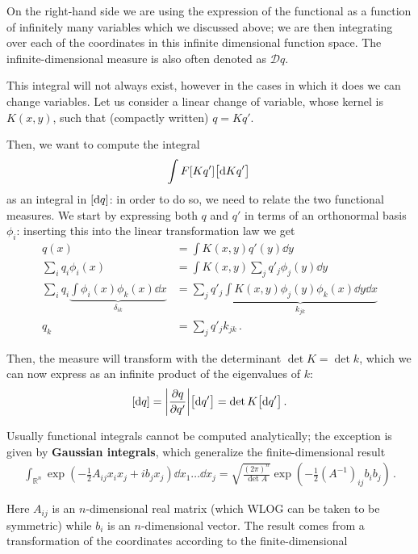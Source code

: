 \documentclass[main.tex]{subfiles}
\begin{document}
On the right-hand side we are using the expression of the functional as a function of infinitely many variables which we discussed above;
we are then integrating over each of the coordinates in this infinite dimensional function space.
The infinite-dimensional measure is also often denoted as \(\mathcal{D}q\). 

This integral will not always exist, however in the cases in which it does we can change variables. 
Let us consider a linear change of variable, whose kernel is \(K(x, y)\), such that (compactly written) \(q = K q'\). 

Then, we want to compute the integral 
%
\begin{align}
\int F[Kq'] \qty[ \dd{Kq'}] 
\,
\end{align}
%
as an integral in \(\qty[ \dd{q}]\): in order to do so, we need to relate the two functional measures. 
We start by expressing both \(q\) and \(q'\) in terms of an orthonormal basis \(\phi _i\): inserting this into the linear transformation law we get 
%
\begin{align}
q(x) &= \int K(x, y) q'(y) \dd{y}  \\
\sum _{i} q_i \phi _i(x) &= \int K(x, y) \sum _{j} q'_j \phi _j (y) \dd{y}  \\
\sum _{i} q_i \underbrace{\int \phi _i (x) \phi _k (x) \dd{x}}_{ \delta_{ik}} 
&= 
\sum _{j} q'_j \underbrace{\int K(x, y) \phi _j (y) \phi _k (x) \dd{y} \dd{x}}_{ k_{jk}}  \\
q_k &= \sum _{j} q'_j k_{jk}
\,.
\end{align}

Then, the measure will transform with the determinant \(\det K = \det k\), which we can now express as an infinite product of the eigenvalues of \(k\): 
%
\begin{align}
\qty[ \dd{q}] = \abs{\pdv{q}{q'}} \qty[ \dd{q'}] = \det K \qty[ \dd{q'}]
\,.
\end{align}

Usually functional integrals cannot be computed analytically; the exception is given by \textbf{Gaussian integrals}, which generalize the finite-dimensional result 
%
\begin{align}
\int_{\mathbb{R}^{n}} \exp(- \frac{1}{2} A_{ij} x_i x_j + i b_j x_j) \dd{x_1 } \dots \dd{x_j} = \sqrt{\frac{(2 \pi)^{n}}{\det A}}
\exp(- \frac{1}{2} (A^{-1})_{ij} b_i b_j)
\,.
\end{align}

Here \(A_{ij}\) is an \(n\)-dimensional real matrix (which WLOG can be taken to be symmetric) while \(b_i\) is an \(n\)-dimensional vector.
The result comes from a transformation of the coordinates according to the finite-dimensional 
\end{document}
